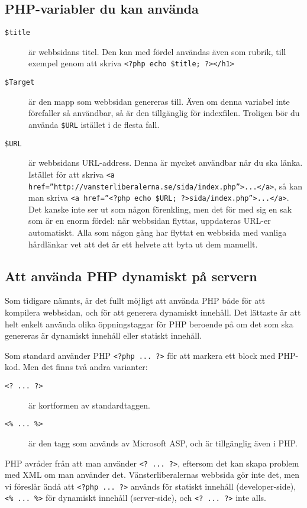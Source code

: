 \documentclass[a4paper,10pt]{article}
\begin{document}
\subsection{PHP-variabler du kan använda}
\begin{description}
	\item[{\tt \$title}] är webbsidans titel. Den kan med fördel användas även som rubrik, till exempel genom att skriva {\tt <h1><?php echo \$title; ?></h1>}
	\item[{\tt \$Target}] är den mapp som webbsidan genereras till. Även om denna variabel inte förefaller så användbar, så är den tillgänglig för indexfilen. Troligen bör du använda {\tt \$URL} istället i de flesta fall. 
	\item[{\tt \$URL}] är webbsidans URL-address. Denna är mycket användbar när du ska länka. Istället för att skriva {\tt <a href=''http://vansterliberalerna.se/sida/index.php''>...</a>}, så kan man skriva {\tt <a href=''<?php echo \$URL; ?>sida/index.php''>...</a>}. Det kanske inte ser ut som någon förenkling, men det för med sig en sak som är en enorm fördel: när webbsidan flyttas, uppdateras URL-er automatiskt. Alla som någon gång har flyttat en webbsida med vanliga hårdlänkar vet att det är ett helvete att byta ut dem manuellt. 
\end{description}

\subsection{Att använda PHP dynamiskt på servern}
\label{server-side-php}
Som tidigare nämnts, är det fullt möjligt att använda PHP både för att kompilera webbsidan, och för att generera dynamiskt innehåll. Det lättaste är att helt enkelt använda olika öppningstaggar för PHP beroende på om det som ska genereras är dynamiskt innehåll eller statiskt innehåll. 

Som standard använder PHP {\tt <?php ... ?>} för att markera ett block med PHP-kod. Men det finns två andra varianter: 

\begin{description}
	\item[{\tt <? ... ?>}] är kortformen av standardtaggen. 
	\item[{\tt <\% ... \%>}] är den tagg som används av Microsoft ASP, och är tillgänglig även i PHP. 
\end{description}

PHP avråder från att man använder {\tt <? ... ?>}, eftersom det kan skapa problem med XML om man använder det. Vänsterliberalernas webbsida gör inte det, men vi föreslår ändå att {\tt <?php ... ?>} används för statiskt innehåll (developer-side), {\tt <\% ... \%>} för dynamiskt innehåll (server-side), och {\tt <? ... ?>} inte alls. 
\end{document}

